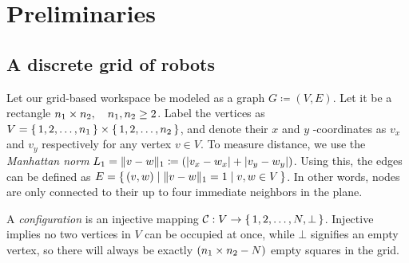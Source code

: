 \section{Preliminaries}
%
%
%




\subsection{A discrete grid of robots}
Let our grid-based workspace be modeled as a graph $G \coloneqq (V, E)$. 
Let it be a rectangle ${ n_1 \times n_2 }, \quad n_1, n_2 \geq 2$. 
Label the vertices as $V = \set{1, 2, \dots , n_1} \times \set{1, 2, \dots , n_2}$, and denote their $x$ and $y$ -coordinates as $v_x$ and $v_y$ respectively for any vertex $v \in V$.
To measure distance, we use the \emph{Manhattan norm} $L_1 = \lVert v - w\rVert_1 \coloneqq (\lvert v_x - w_x\rvert + \lvert v_y - w_y\rvert)$.
Using this, the edges can be defined as $E = \set{(v, w) \mid \lVert v - w\rVert_1 = 1 \mid v, w \in V}$.
In other words, nodes are only connected to their up to four immediate neighbors in the plane.

A \emph{configuration} is an injective mapping $\mathcal{C}_{} : V \rightarrow \set{1, 2, \dots, N, \bot}$. 
Injective implies no two vertices in $V$ can be occupied at once, while $\bot$ signifies an empty vertex, so there will always be exactly $({ n_1 \times n_2 } - N)$ empty squares in the grid. 

